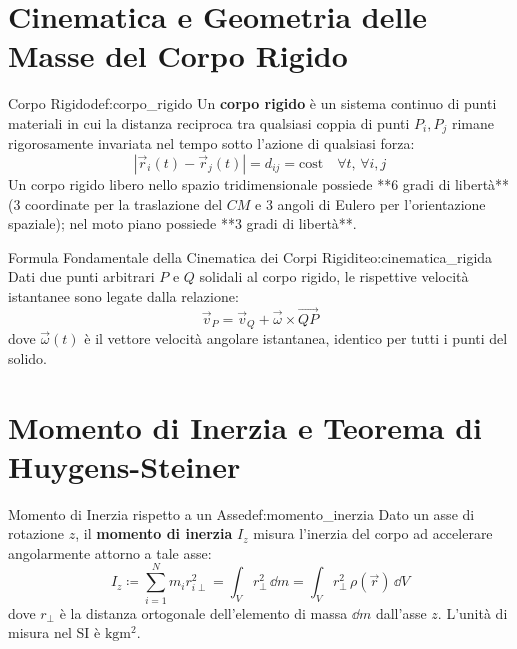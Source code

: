 \section{Cinematica e Geometria delle Masse del Corpo Rigido}
\label{sec:cinematica_rigida}

\begin{definizione}{Corpo Rigido}{def:corpo_rigido}
Un \textbf{corpo rigido} è un sistema continuo di punti materiali in cui la distanza reciproca tra qualsiasi coppia di punti $P_i, P_j$ rimane rigorosamente invariata nel tempo sotto l'azione di qualsiasi forza:
\begin{equation}
    |\vec{r}_i(t) - \vec{r}_j(t)| = d_{ij} = \text{cost} \quad \forall t, \, \forall i, j
\end{equation}
Un corpo rigido libero nello spazio tridimensionale possiede **6 gradi di libertà** (3 coordinate per la traslazione del $CM$ e 3 angoli di Eulero per l'orientazione spaziale); nel moto piano possiede **3 gradi di libertà**.
\end{definizione}

\begin{teorema}{Formula Fondamentale della Cinematica dei Corpi Rigidi}{teo:cinematica_rigida}
Dati due punti arbitrari $P$ e $Q$ solidali al corpo rigido, le rispettive velocità istantanee sono legate dalla relazione:
\begin{equation}
    \vec{v}_P = \vec{v}_Q + \vec{\omega} \times \vec{QP}
    \label{eq:formula_corpo_rigido}
\end{equation}
dove $\vec{\omega}(t)$ è il vettore velocità angolare istantanea, identico per tutti i punti del solido.
\end{teorema}

\section{Momento di Inerzia e Teorema di Huygens-Steiner}
\label{sec:momento_inerzia}

\begin{definizione}{Momento di Inerzia rispetto a un Asse}{def:momento_inerzia}
Dato un asse di rotazione $z$, il \textbf{momento di inerzia} $I_z$ misura l'inerzia del corpo ad accelerare angolarmente attorno a tale asse:
\begin{equation}
    I_z \coloneqq \sum_{i=1}^N m_i r_{i\perp}^2 = \int_V r_\perp^2\,\dd m = \int_V r_\perp^2\,\rho(\vec{r})\,\dd V
    \label{eq:momento_inerzia_def}
\end{equation}
dove $r_\perp$ è la distanza ortogonale dell'elemento di massa $\dd m$ dall'asse $z$. L'unità di misura nel SI è $\si{\kilogram\metre\squared}$.
\end{definizione}

